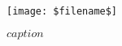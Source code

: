 
\vspace{-2cm}
\begin{figure}
	\centering
		\texttt{[image: \$filename\$]}
	\caption{$caption$}
\end{figure}
